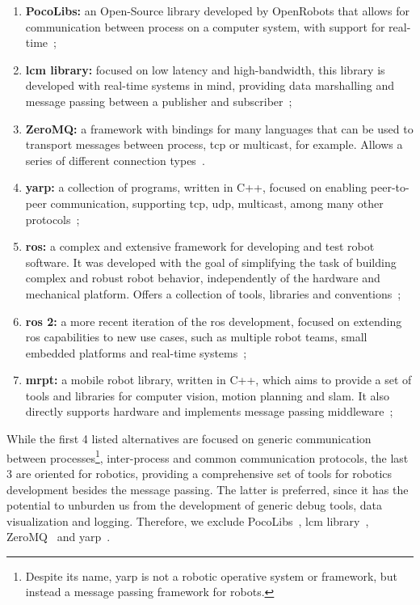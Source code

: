 \begin{enumerate}
	\item \textbf{PocoLibs:} an Open-Source library developed by OpenRobots that allows for communication between process on a computer system, with support for real-time~\cite{Pocolibs};
	\item \textbf{\ac{lcm} library:} focused on low latency and high-bandwidth, this library is developed with real-time systems in mind, providing data marshalling and message passing between a publisher and subscriber~\cite{Huang2010};
	\item \textbf{ZeroMQ:} a framework with bindings for many languages that can be used to transport messages between process, \ac{tcp} or multicast, for example. Allows a series of different connection types~\cite{ZeroMQ}.
	\item \textbf{\ac{yarp}:} a collection of programs, written in C++, focused on enabling peer-to-peer communication, supporting \ac{tcp}, \ac{udp}, multicast, among many other protocols~\cite{Metta2006};
	\item \textbf{\ac{ros}:} a complex and extensive framework for developing and test robot software. It was developed with the goal of simplifying the task of building complex and robust robot behavior, independently of the hardware and mechanical platform. Offers a collection of tools, libraries and conventions~\cite{ROS};
	\item \textbf{\ac{ros} 2:} a more recent iteration of the \ac{ros} development, focused on extending \ac{ros} capabilities to new use cases, such as multiple robot teams, small embedded platforms and real-time systems~\cite{ROS2};
	\item \textbf{\ac{mrpt}:} a mobile robot library, written in C++, which aims to provide a set of tools and libraries for computer vision, motion planning and \ac{slam}. It also directly supports hardware and implements message passing middleware~\cite{MRPT};
\end{enumerate}

While the first 4 listed alternatives are focused on generic communication between processes\footnote{Despite its name, \acf{yarp} is not a robotic operative system or framework, but instead a message passing framework for robots.}, inter-process and common communication protocols, the last 3 are oriented for robotics, providing a comprehensive set of tools for robotics development besides the message passing. The latter is preferred, since it has the potential to unburden us from the development of generic debug tools, data visualization and logging. Therefore, we exclude PocoLibs~\cite{Pocolibs}, \ac{lcm} library~\cite{Huang2010}, ZeroMQ~\cite{ZeroMQ} and \ac{yarp}~\cite{Metta2006}.

